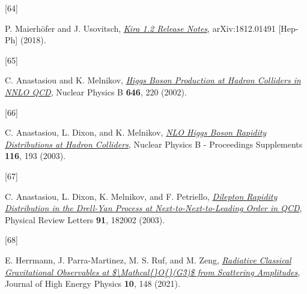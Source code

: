 \documentclass[
  11pt,
  a4paper,
  DIV=11,
  numbers=noendperiod,
  twoside]{scrreprt}
\newlength{\cslhangindent}
\newlength{\csllabelwidth}
\newlength{\cslentryspacingunit} %
\newenvironment{CSLReferences}[2] %
 {%
  \setlength{\parindent}{0pt}
  \ifodd #1
  \let\oldpar\par
  \def\par{\hangindent=\cslhangindent\oldpar}
  \fi
  \setlength{\parskip}{#2\cslentryspacingunit}
 }%
 {}
\newcommand{\CSLLeftMargin}[1]{\parbox[t]{\csllabelwidth}{#1}}
\newcommand{\CSLRightInline}[1]{\parbox[t]{\linewidth - \csllabelwidth}{#1}\break}
\DeclareRobustCommand{\[}{\begin{equation}}
\DeclareRobustCommand{\]}{\end{equation}}
\begin{document}
\begin{CSLReferences}{0}{0}
\leavevmode{}%
\CSLLeftMargin{{[}64{]} }%
\CSLRightInline{P. Maierhöfer and J. Usovitsch,
\emph{\href{https://arxiv.org/abs/1812.01491}{Kira 1.2 {Release
Notes}}}, arXiv:1812.01491 {[}Hep-Ph{]} (2018).}

\leavevmode{}%
\CSLLeftMargin{{[}65{]} }%
\CSLRightInline{C. Anastasiou and K. Melnikov,
\emph{\href{https://doi.org/10.1016/S0550-3213(02)00837-4}{Higgs Boson
Production at Hadron Colliders in {NNLO QCD}}}, Nuclear Physics B
\textbf{646}, 220 (2002).}

\leavevmode{}%
\CSLLeftMargin{{[}66{]} }%
\CSLRightInline{C. Anastasiou, L. Dixon, and K. Melnikov,
\emph{\href{https://doi.org/10.1016/S0920-5632(03)80168-8}{{NLO Higgs}
Boson Rapidity Distributions at Hadron Colliders}}, Nuclear Physics B -
Proceedings Supplements \textbf{116}, 193 (2003).}

\leavevmode{}%
\CSLLeftMargin{{[}67{]} }%
\CSLRightInline{C. Anastasiou, L. Dixon, K. Melnikov, and F. Petriello,
\emph{\href{https://doi.org/10.1103/PhysRevLett.91.182002}{Dilepton
{Rapidity Distribution} in the {Drell-Yan Process} at
{Next-to-Next-to-Leading Order} in {QCD}}}, Physical Review Letters
\textbf{91}, 182002 (2003).}

\leavevmode{}%
\CSLLeftMargin{{[}68{]} }%
\CSLRightInline{E. Herrmann, J. Parra-Martinez, M. S. Ruf, and M. Zeng,
\emph{\href{https://doi.org/10.1007/JHEP10(2021)148}{Radiative Classical
Gravitational Observables at
\$\textbackslash Mathcal\{\vphantom\}{O}\vphantom\{\}({G}3̂)\$ from
Scattering Amplitudes}}, Journal of High Energy Physics \textbf{10}, 148
(2021).}

\end{CSLReferences}
\end{document}
